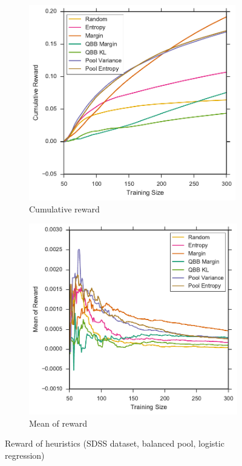 \begin{figure}[p]
	\centering
	\begin{subfigure}{.5\textwidth}
		\centering
		\includegraphics[width=0.99\textwidth]{figures/5_thompson/sdss_bl_sum_rewards}
		\caption{Cumulative reward}
		\label{fig:sdss_bl_sum_rewards}
	\end{subfigure}%
	\begin{subfigure}{.5\textwidth}
		\centering
		\includegraphics[width=0.99\linewidth]{figures/5_thompson/sdss_bl_avg_rewards}
		\caption{Mean of reward}
		\label{fig:sdss_bl_avg_rewards}
	\end{subfigure}
	\caption[Reward of heuristics (SDSS, balanced, logistic)]{
		Reward of heuristics (SDSS dataset, balanced pool, logistic regression)}
	\label{fig:sdss_bl_rewards}
\end{figure}

